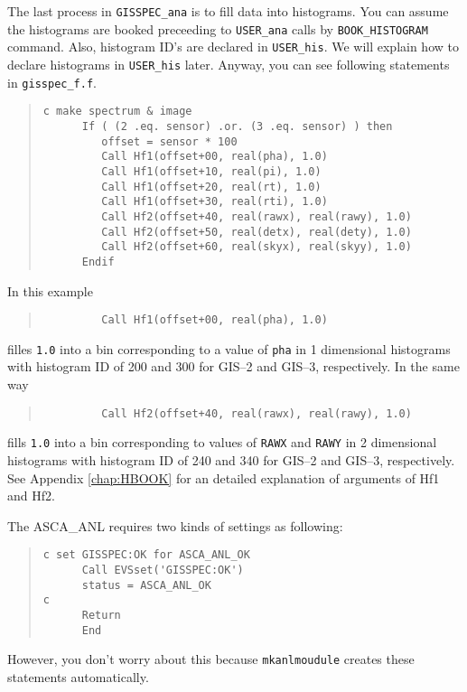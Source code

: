 The last process in {\tt GISSPEC\_ana} is to fill data into histograms.
You can assume the histograms are booked preceeding to {\tt USER\_ana} calls
by {\tt BOOK\_HISTOGRAM} command.
Also,
histogram ID's are declared in {\tt USER\_his}.
We will explain how to declare histograms in {\tt USER\_his} later.
Anyway,
you can see following statements in {\tt gisspec\_f.f}.
\begin{quote}\baselineskip 3.2mm\begin{verbatim}
c make spectrum & image
      If ( (2 .eq. sensor) .or. (3 .eq. sensor) ) then
         offset = sensor * 100
         Call Hf1(offset+00, real(pha), 1.0)
         Call Hf1(offset+10, real(pi), 1.0)
         Call Hf1(offset+20, real(rt), 1.0)
         Call Hf1(offset+30, real(rti), 1.0)
         Call Hf2(offset+40, real(rawx), real(rawy), 1.0)
         Call Hf2(offset+50, real(detx), real(dety), 1.0)
         Call Hf2(offset+60, real(skyx), real(skyy), 1.0)
      Endif
\end{verbatim}\end{quote}
In this example
\begin{quote}\baselineskip 3.2mm\begin{verbatim}
         Call Hf1(offset+00, real(pha), 1.0)
\end{verbatim}\end{quote}
filles {\tt 1.0} into a bin
corresponding to a value of {\tt pha} in 1 dimensional histograms
with histogram ID of 200 and 300 for GIS--2 and GIS--3, respectively.
In the same way
\begin{quote}\baselineskip 3.2mm\begin{verbatim}
         Call Hf2(offset+40, real(rawx), real(rawy), 1.0)
\end{verbatim}\end{quote}
fills {\tt 1.0} into a bin
corresponding to values of {\tt RAWX} and {\tt RAWY}
in 2 dimensional histograms
with histogram ID of 240 and 340 for GIS--2 and GIS--3, respectively.
See Appendix \ref{chap:HBOOK}
for an detailed explanation of arguments of Hf1 and Hf2.

The ASCA\_ANL requires two kinds of settings as following:
\begin{quote}\baselineskip 3.2mm\begin{verbatim}
c set GISSPEC:OK for ASCA_ANL_OK
      Call EVSset('GISSPEC:OK')
      status = ASCA_ANL_OK
c
      Return
      End
\end{verbatim}\end{quote}
However, you don't worry about this
because {\tt mkanlmoudule} creates these statements automatically.

